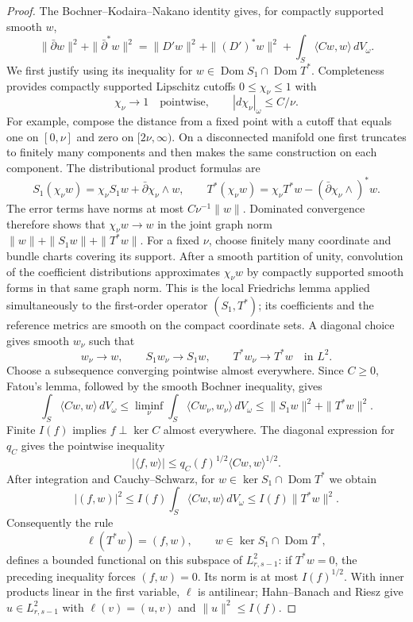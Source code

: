 \documentclass[11pt,reqno]{amsart}
\numberwithin{equation}{section}
\theoremstyle{definition}
\theoremstyle{remark}
\begin{document}
\begin{proof}
The Bochner--Kodaira--Nakano identity gives, for compactly supported
smooth $w$,
\[
 \|\bar\partial w\|^2+\|\bar\partial^*w\|^2
 =\|D'w\|^2+\|(D')^*w\|^2+
   \int_S\langle Cw,w\rangle\,dV_\omega.
\]
We first justify using its inequality for
$w\in\operatorname{Dom}S_1\cap\operatorname{Dom}T^*$.
Completeness provides compactly supported Lipschitz cutoffs
$0\le\chi_\nu\le1$ with
\[
 \chi_\nu\longrightarrow1\quad\text{pointwise},\qquad
 |d\chi_\nu|_\omega\le C/\nu.
\]
For example, compose the distance from a fixed point with a cutoff
that equals one on $[0,\nu]$ and zero on $[2\nu,\infty)$.
On a disconnected manifold one first truncates to finitely many
components and then makes the same construction on each component.
The distributional product formulas are
\[
 S_1(\chi_\nu w)=\chi_\nu S_1w+\bar\partial\chi_\nu\wedge w,
 \qquad
 T^*(\chi_\nu w)=\chi_\nu T^*w
                    -(\bar\partial\chi_\nu\wedge)^*w.
\]
The error terms have norms at most $C\nu^{-1}\|w\|$.  Dominated
convergence therefore shows that $\chi_\nu w\to w$ in the joint
graph norm
$\|w\|+\|S_1w\|+\|T^*w\|$.  For a fixed $\nu$, choose finitely many
coordinate and bundle charts covering its support.  After a smooth
partition of unity, convolution of the coefficient distributions
approximates $\chi_\nu w$ by compactly supported smooth forms in
that same graph norm.  This is the local Friedrichs lemma applied
simultaneously to the first-order operator $(S_1,T^*)$; its
coefficients and the reference metrics are smooth on the compact
coordinate sets.  A diagonal choice gives smooth $w_\nu$ such that
\[
 w_\nu\to w,\qquad S_1w_\nu\to S_1w,\qquad T^*w_\nu\to T^*w
 \quad\text{in }L^2.
\]
Choose a subsequence converging pointwise almost everywhere.
Since $C\ge0$, Fatou's lemma, followed by the smooth Bochner
inequality, gives
\[
 \int_S\langle Cw,w\rangle\,dV_\omega
 \le\liminf_\nu\int_S\langle Cw_\nu,w_\nu\rangle\,dV_\omega
 \le\|S_1w\|^2+\|T^*w\|^2.
\]
Finite $I(f)$ implies $f\perp\ker C$ almost everywhere.  The
diagonal expression for $q_C$ gives the pointwise inequality
\[
 |\langle f,w\rangle|
 \le q_C(f)^{1/2}\langle Cw,w\rangle^{1/2}.
\]
After integration and Cauchy--Schwarz, for
$w\in\ker S_1\cap\operatorname{Dom}T^*$ we obtain
\[
 |(f,w)|^2\le I(f)\int_S\langle Cw,w\rangle\,dV_\omega
             \le I(f)\|T^*w\|^2.
\]
Consequently the rule
\[
 \ell(T^*w)=(f,w),\qquad
 w\in\ker S_1\cap\operatorname{Dom}T^*,
\]
defines a bounded functional on this subspace of $L^2_{r,s-1}$:
if $T^*w=0$, the preceding inequality forces $(f,w)=0$.
Its norm is at most $I(f)^{1/2}$.  With inner products linear in
the first variable, $\ell$ is antilinear; Hahn--Banach and Riesz
give $u\in L^2_{r,s-1}$ with
$\ell(v)=(u,v)$ and $\|u\|^2\le I(f)$.


\end{proof}
\end{document}

